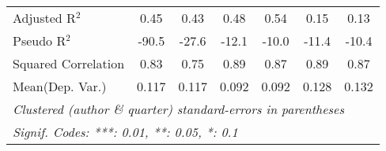 \begin{tabular}{lcccccc}
   Adjusted R$^2$                                             & 0.45    & 0.43    & 0.48         & 0.54    & 0.15    & 0.13\\  
   Pseudo R$^2$                                               & -90.5   & -27.6   & -12.1        & -10.0   & -11.4   & -10.4\\  
   Squared Correlation                                        & 0.83    & 0.75    & 0.89         & 0.87    & 0.89    & 0.87\\  
Mean(Dep. Var.) & 0.117 & 0.117 & 0.092 & 0.092 & 0.128 & 0.132 \\
   \midrule \midrule
   \multicolumn{7}{l}{\emph{Clustered (author \& quarter) standard-errors in parentheses}}\\
   \multicolumn{7}{l}{\emph{Signif. Codes: ***: 0.01, **: 0.05, *: 0.1}}\\
\end{tabular}
\par\endgroup
